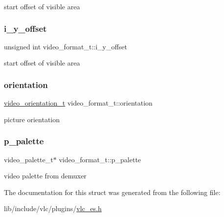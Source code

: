 start offset of visible area \mbox{\label{structvideo__format__t_a11f9b4658f3b8c4008e37b44344fffd1}} 
\subsubsection{\texorpdfstring{i\+\_\+y\+\_\+offset}{i\_y\_offset}}
{\footnotesize\ttfamily unsigned int video\+\_\+format\+\_\+t\+::i\+\_\+y\+\_\+offset}

start offset of visible area \mbox{\label{structvideo__format__t_a437fe07cfa0bad59e9003a0f1f51fac5}} 
\subsubsection{\texorpdfstring{orientation}{orientation}}
{\footnotesize\ttfamily \hyperlink{vlc__es_8h_a1a6878c41244a468be3869ca422934a4}{video\+\_\+orientation\+\_\+t} video\+\_\+format\+\_\+t\+::orientation}

picture orientation \mbox{\label{structvideo__format__t_a69ac38b3e5159bd1622d29372972eaa1}} 
\subsubsection{\texorpdfstring{p\+\_\+palette}{p\_palette}}
{\footnotesize\ttfamily video\+\_\+palette\+\_\+t$\ast$ video\+\_\+format\+\_\+t\+::p\+\_\+palette}

video palette from demuxer 

The documentation for this struct was generated from the following file\+:\begin{DoxyCompactItemize}
\item 
lib/include/vlc/plugins/\hyperlink{vlc__es_8h}{vlc\+\_\+es.\+h}\end{DoxyCompactItemize}
